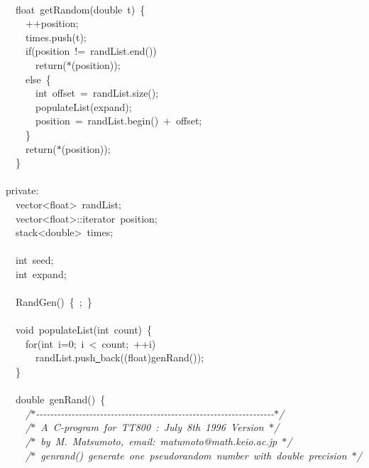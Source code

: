 {\ \\
\ \ float\ getRandom(double\ t)\ \{\\
\ \ \ \ ++position;\\
\ \ \ \ times.push(t);\\
\ \ \ \ if(position\ !=\ randList.end())\\
\ \ \ \ \ \ return($\ast$(position));\\
\ \ \ \ else\ \{\\
\ \ \ \ \ \ int\ offset\ =\ randList.size();\\
\ \ \ \ \ \ populateList(expand);\\
\ \ \ \ \ \ position\ =\ randList.begin()\ +\ offset;\\
\ \ \ \ \}\\
\ \ \ \ return($\ast$(position));\\
\ \ \}\\
\ \\
private:\\
\ \ vector<{}float>{}\ randList;\\
\ \ vector<{}float>{}::iterator\ position;\\
\ \ stack<{}double>{}\ times;\\
\ \\
\ \ int\ seed;\\
\ \ int\ expand;\\
\ \\
\ \ RandGen()\ \{\ ;\ \}\\
\ \\
\ \ void\ populateList(int\ count)\ \{\\
\ \ \ \ for(int\ i=0;\ i\ <{}\ count;\ ++i)\\
\ \ \ \ \ \ randList.push\underline\ back((float)genRand());\\
\ \ \}\\
\ \\
\ \ double\ genRand()\ \{\\
\ \ \ \ \textsl{/$\ast$-{}-{}-{}-{}-{}-{}-{}-{}-{}-{}-{}-{}-{}-{}-{}-{}-{}-{}-{}-{}-{}-{}-{}-{}-{}-{}-{}-{}-{}-{}-{}-{}-{}-{}-{}-{}-{}-{}-{}-{}-{}-{}-{}-{}-{}-{}-{}-{}-{}-{}-{}-{}-{}-{}-{}-{}-{}-{}-{}-{}-{}-{}-{}-{}-{}-{}-{}$\ast$/}\\
\ \ \ \ \textsl{/$\ast$\ A\ C-{}program\ for\ TT800\ :\ July\ 8th\ 1996\ Version\ $\ast$/}\\
\ \ \ \ \textsl{/$\ast$\ by\ M.\ Matsumoto,\ email:\ matumoto@math.keio.ac.jp\ $\ast$/}\\
\ \ \ \ \textsl{/$\ast$\ genrand()\ generate\ one\ pseudorandom\ number\ with\ double\ precision\ $\ast$/}\\
}
